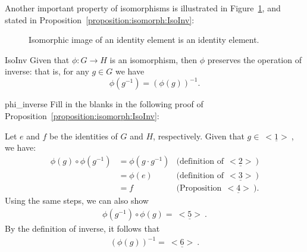 Another important property of isomorphisms is illustrated in Figure~\ref{fig:isomorph:isomInv}, and stated in Proposition~\ref{proposition:isomorph:IsoInv}:

\begin{figure}[htb]
	  \caption{\label{fig:isomorph:isomInv} Isomorphic image of an  identity element is an identity element. }
\end{figure}

\begin{prop}{IsoInv}
Given that  $\phi : G \rightarrow H$ is an  isomorphism, then $\phi$ preserves the operation of inverse: that is, for any $g \in G$ we have
\begin{equation*}
\phi(g^{-1}) = (\phi(g))^{-1}.
\end{equation*}
\end{prop}

\begin{exercise}{phi_inverse}
Fill in the blanks in the following proof of Proposition~\ref{proposition:isomorph:IsoInv}:
\medskip

\noindent
Let $e$ and $f$ be the identities of $G$ and $H$, respectively. Given that $g \in \underline{~<1>~}$, we have:
\begin{align*}
\phi(g) \circ \phi(g^{-1}) &= \phi(g \cdot g^{-1}) & \textrm{(definition of}~\underline{~<2>~})\\
&= \phi(e) &\textrm{(definition of}~\underline{~<3>~})\\
&= f &\textrm{(Proposition}~\underline{~<4>~} ).
\end{align*}
Using the same steps, we can also show
\begin{align*}
\phi(g^{-1}) \circ \phi(g) = \underline{~<5>~}.
\end{align*}
By the definition of inverse, it follows that
\begin{align*}
( \phi(g))^{-1} = \underline{~<6>~}.
\end{align*}
\end{exercise} 

